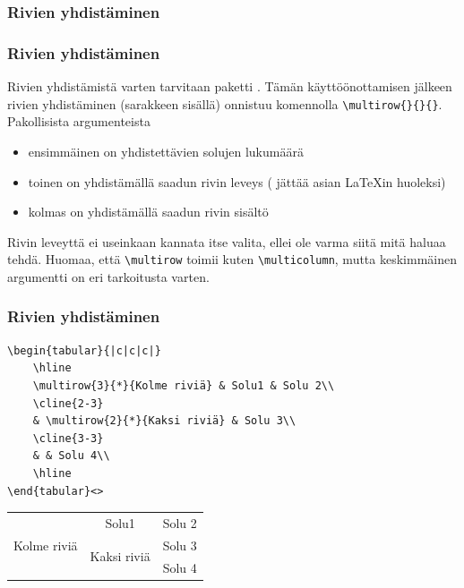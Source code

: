 \subsubsection{Rivien yhdistäminen}
\begin{fframe}
    \frametitle{Rivien yhdistäminen}
    Rivien yhdistämistä varten tarvitaan paketti . Tämän käyttöönottamisen jälkeen rivien yhdistäminen (sarakkeen sisällä) onnistuu komennolla \lstinline-\multirow{}{}{}-. Pakollisista argumenteista
    \begin{itemize}
        \item ensimmäinen on yhdistettävien solujen lukumäärä
        \pause
        \item toinen on yhdistämällä saadun rivin leveys (\cns{*} jättää asian \LaTeX in huoleksi)
        \pause
        \item kolmas on yhdistämällä saadun rivin sisältö
    \end{itemize}
    \pause
    Rivin leveyttä ei useinkaan kannata itse valita, ellei ole varma siitä mitä haluaa tehdä. 
    \pause
    \vaihto
    Huomaa, että \lstinline-\multirow- toimii kuten \lstinline-\multicolumn-, mutta keskimmäinen argumentti on eri tarkoitusta varten.
\end{fframe}

\begin{fframe}
    \frametitle{Rivien yhdistäminen} 
    \begin{lstlisting}
\begin{tabular}{|c|c|c|}
    \hline
    \multirow{3}{*}{Kolme riviä} & Solu1 & Solu 2\\
    \cline{2-3}
    & \multirow{2}{*}{Kaksi riviä} & Solu 3\\
    \cline{3-3}
    & & Solu 4\\
    \hline
\end{tabular}<>
    \end{lstlisting}
    \begin{serif}
        \begin{small}
            \begin{tabular}{|c|c|c|}
                \hline
                \multirow{3}{*}{Kolme riviä} & Solu1	& Solu 2\\\cline{2-3}
                                              & \multirow{2}{*}{Kaksi riviä}	& Solu 3\\\cline{3-3}
                                              & & Solu 4\\
                \hline
            \end{tabular}
        \end{small}
    \end{serif}
\end{fframe}

